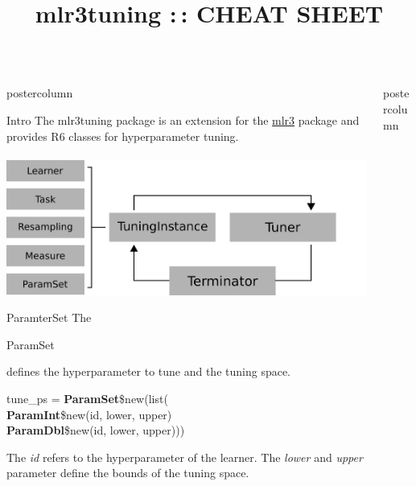 \documentclass{beamer}
\title{mlr3tuning :\,: CHEAT SHEET} %
\newlength{\columnheight} %
\newcommand{\codeinline}[1]{\begin{codeboxinline}#1\end{codeboxinline}}
\begin{document}
\begin{frame}[fragile]{}
	\begin{columns}
		\begin{column}{.245\textwidth}
			\begin{beamercolorbox}[center]{postercolumn}
				\begin{minipage}{.98\textwidth}
					\parbox[t][\columnheight]{\textwidth}{
						\begin{myblock}{Intro}
							The mlr3tuning package is an extension for the \href{https://github.com/mlr-org/mlr3}{mlr3} package and provides R6 classes for hyperparameter tuning.
							\\
							\\
							\includegraphics[width=\textwidth]{img/tuning_objects.png}
						\end{myblock}
						\begin{myblock}{ParamterSet}
							The \codeinline{ParamSet} defines the hyperparameter to tune and the tuning space.
							\\
							\begin{codeboxmultiline}[width=19cm]
								tune\_ps = \textbf{ParamSet}\$new(list(\\
								\hspace*{1ex}\textbf{ParamInt}\$new(id, lower, upper)\\
								\hspace*{1ex}\textbf{ParamDbl}\$new(id, lower, upper)))
							\end{codeboxmultiline}
							The \textit{id} refers to the hyperparameter of the learner. The \textit{lower} and \textit{upper} parameter define the bounds of the tuning space.
						\end{myblock}
						\vfill}
				\end{minipage}
			\end{beamercolorbox}
		\end{column}
		\begin{column}{.245\textwidth}
			\begin{beamercolorbox}[center]{postercolumn}

\end{beamercolorbox}
\end{column}
\end{columns}
\end{frame}
\end{document}
